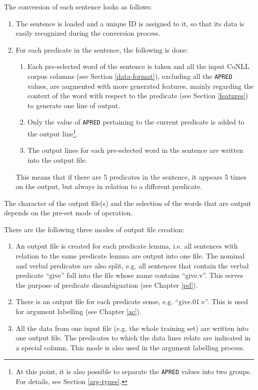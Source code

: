 \documentclass[12pt,notitlepage]{report}
\begin{document}
The conversion of each sentence looks as follows:
\begin{enumerate}
    \item The sentence is loaded and a unique ID is assigned to it, so that its data is easily recognized during the conversion process.
    \item For each predicate in the sentence, the following is done:
    \begin{enumerate}
        \item Each pre-selected word of the sentence is taken and all the input CoNLL corpus columns (see Section \ref{data-format}), excluding all the \texttt{APRED} values, are augmented with more generated features, mainly regarding the context of the word with respect to the predicate (see Section \ref{features}) to generate one line of output.
        \item Only the value of \texttt{APRED} pertaining to the current predicate is added to the output line\footnote{At this point, it is also possible to separate the \texttt{APRED} values into two groups. For details, see Section \ref{arg-types}.}.
        \item The output lines for each pre-selected word in the sentence are written into the output file.
    \end{enumerate}
    This means that if there are 5 predicates in the sentence, it appears 5 times on the output, but always in relation to a different predicate.
\end{enumerate}
The character of the output file(s) and the selection of the words that are output depends on the pre-set mode of operation. 

There are the following three modes of output file creation:
\begin{enumerate}
    \item An output file is created for each predicate lemma, i.e. all sentences with relation to the same predicate lemma are output into one file. The nominal and verbal predicates are also split, e.g. all sentences that contain the verbal predicate ``give'' fall into the file whose name contains ``give.v''. This serves the purpose of predicate disambiguation (see Chapter \ref{pd}).
    \item There is an output file for each predicate sense, e.g. ``give.01.v''. This is used for argument labelling (see Chapter \ref{ac}).
    \item All the data from one input file (e.g. the whole training set) are written into one output file. The predicates to which the data lines relate are indicated in a special column. This mode is also used in the argument labelling process.
\end{enumerate}
\end{document}
